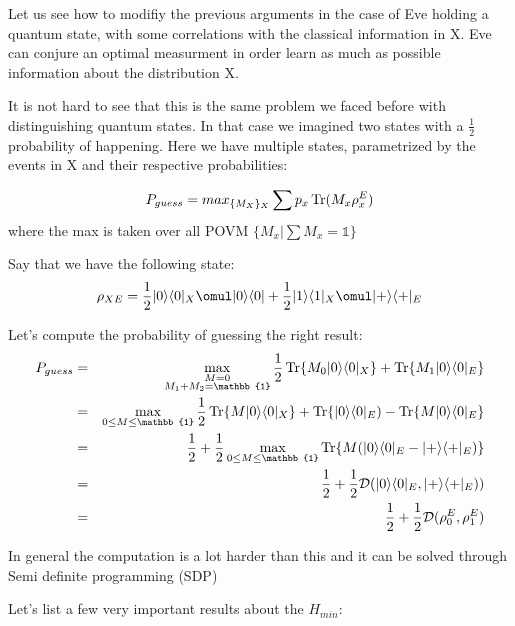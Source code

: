 Let us see how to modifiy the previous arguments in the case of Eve holding a quantum state, with some correlations with the classical information in X. Eve can conjure an optimal measurment in order learn as much as possible information about the distribution X.

It is not hard to see that this is the same problem we faced before with distinguishing quantum states. In that case we imagined two states with a $\frac{1}{2}$ probability of happening. Here we have multiple states, parametrized by the events in X and their respective probabilities:

\begin{equation}
	P_{guess} = max_{\{ M_X\}_X} \sum p_x \operatorname{Tr} (M_x \rho_x^E)
\end{equation}
where the max is taken over all POVM $\{M_x |  \sum M_x = \mathbb{1}\}$

\begin{example}
	Say that we have the following state:
	\begin{equation}
		\rho_{XE} =  \frac{1}{2} \density{0}{0}_X \omul \ket{0}\bra{0} + \frac{1}{2} \density{1}{1}_X \omul \ket{+}\bra{+}_E
	\end{equation}

	Let's compute the probability of guessing the right result:
	\begin{eqnarray}
		P_{guess} &=&
		\max_{\substack{M = 0\\ M_1 + M_2 = \mathbb{1}}} \frac{1}{2} \Tr  \{M_0 \density{0}{0}_X\}  + \Tr\{M_1 \ket{0}\bra{0}_E\} \nonumber \\
		&=&
		\max_{\substack{0 \le M \le \mathbb{1}}} \frac{1}{2} \Tr \{M\density{0}{0}_X\} + \Tr\{\ket{0}\bra{0}_E) - \Tr\{M\ket{0}\bra{0}_E\} \nonumber \\
		&=&
		\frac{1}{2} + \frac{1}{2} \max_{\substack{0 \le M \le \mathbb{1}}} \Tr\{M(\ket{0}\bra{0}_E - \ket{+}\bra{+}_E)\} \nonumber \\
		&=& \frac{1}{2} + \frac{1}{2} \mathcal{D}(\ket{0}\bra{0}_E, \ket{+}\bra{+}_E)) \nonumber\\
		&=& \frac{1}{2} + \frac{1}{2} \mathcal{D}(\rho_0^E, \rho_1^E)
	\end{eqnarray}
\end{example}

In general the computation is a lot harder than this and it can be solved through Semi definite programming (SDP)

Let's list a few very important results about the $H_{min}$:

